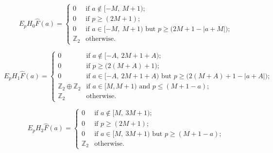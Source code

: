 \documentclass[12pt]{article}
\numberwithin{equation}{subsection}
\numberwithin{theorem}{subsection}
\numberwithin{lemma}{subsection}
\numberwithin{corollary}{subsection}
\numberwithin{definition}{subsection}
\numberwithin{example}{subsection}
\numberwithin{note}{subsection}
\newcommand{\zz}{\mathbb{Z}}
\begin{document}
            \begin{equation}\label{eq:eph-klein-0}
                E_pH_0\widehat{F}(a)=
                \begin{cases}
                    0 &\mbox{if }a\not\in [-M,~M+1);\\
                    0 &\mbox{if }p\geqslant(2M+1);\\
                    0 &\mbox{if }a\in[-M,~M+1)\text{ but }p\geqslant\big(2M+1-|a+M|\big);\\
                    \zz_2 &\mbox{otherwise}.
                \end{cases}
            \end{equation}

            \begin{equation}\label{eq:eph-klein-1}
                E_pH_1\widehat{F}(a)=
                \begin{cases}
                    0 &\mbox{if }a\not\in [-A,~2M+1+A);\\
                    0 &\mbox{if }p\geqslant \big(2(M+A)+1\big);\\
                    0 &\mbox{if }a\in[-A,~2M+1+A)\text{ but }p\geqslant\big(2(M+A)+1-|a+A|\big);\\
                    \zz_2\oplus\zz_2 &\mbox{if }a\in [M,M+1)\text{ and }p\leqslant(M+1-a);\\
                    \zz_2 &\mbox{otherwise}.
                \end{cases}
            \end{equation}

            \begin{equation}\label{eq:eph-klein-2}
                E_pH_2\widehat{F}(a)=
                \begin{cases}
                    0 &\mbox{if }a\not\in [M,~3M+1);\\
                    0 &\mbox{if }p\geqslant(2M+1);\\
                    0 &\mbox{if }a\in[M,~3M+1)\text{ but }p\geqslant(M+1-a);\\
                    \zz_2 &\mbox{otherwise}.
                \end{cases}
            \end{equation}
\end{document}
